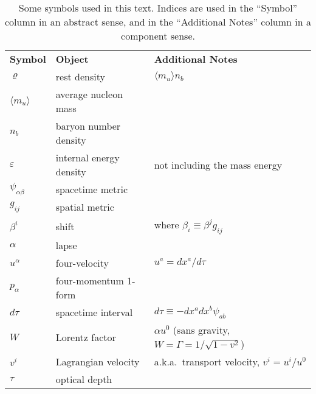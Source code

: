 \begin{table}
  \centering
  \begin{tabular}{lll}
    \textbf{Symbol}       & \textbf{Object}           & \textbf{Additional Notes} \\
    $\varrho$             & rest density              & $\langle m_u \rangle n_b $ \\
    $\langle m_u \rangle$ & average nucleon mass      & \\
    $n_b$                 & baryon number density     & \\
    $\varepsilon$         & internal energy density   & not including the mass energy \\
    $\psi_{\alpha\beta}$  & spacetime metric          & \\
    $g_{ij}$              & spatial metric            & \\
    $\beta^i$             & shift                     & where $\beta_i \equiv \beta^j g_{ij}$ \\
    $\alpha$              & lapse                     & \\
    $u^\alpha$            & four-velocity             & $u^a=dx^a/d\tau$ \\
    $p_\alpha$            & four-momentum 1-form      & \\
    $d\tau$               & spacetime interval        & $d\tau\equiv-dx^a dx^b \psi_{ab}$ \\
    $W$                   & Lorentz factor            & $\alpha u^0$ (sans gravity, $W=\Gamma=1/\sqrt{1-v^2}$) \\
    $v^i$                 & Lagrangian velocity       & a.k.a.\ transport velocity, $v^i=u^i/u^0$ \\
    $\tau$                & optical depth             & \\
  \end{tabular}
  \caption{
    Some symbols used in this text.
    Indices are used in the ``Symbol'' column in an abstract sense, and in the
    ``Additional Notes'' column in a component sense.
  }
  \label{tab:conventions}
\end{table}
